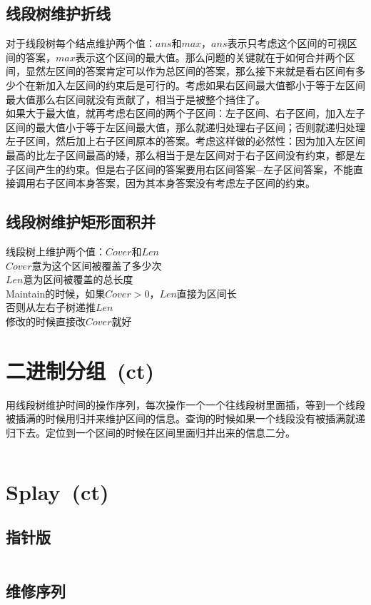	\subsection*{线段树维护折线}
		对于线段树每个结点维护两个值：$ ans $和$ max $，$ ans $表示只考虑这个区间的可视区间的答案，$ max $表示这个区间的最大值。那么问题的关键就在于如何合并两个区间，显然左区间的答案肯定可以作为总区间的答案，那么接下来就是看右区间有多少个在新加入左区间的约束后是可行的。考虑如果右区间最大值都小于等于左区间最大值那么右区间就没有贡献了，相当于是被整个挡住了。
		\\如果大于最大值，就再考虑右区间的两个子区间：左子区间、右子区间，加入左子区间的最大值小于等于左区间最大值，那么就递归处理右子区间；否则就递归处理左子区间，然后加上右子区间原本的答案。考虑这样做的必然性：因为加入左区间最高的比左子区间最高的矮，那么相当于是左区间对于右子区间没有约束，都是左子区间产生的约束。但是右子区间的答案要用右区间答案$ - $左子区间答案，不能直接调用右子区间本身答案，因为其本身答案没有考虑左子区间的约束。
	\subsection*{线段树维护矩形面积并}
		线段树上维护两个值：$ Cover $和$ Len $
		\\$ Cover $意为这个区间被覆盖了多少次
		\\$ Len $意为区间被覆盖的总长度
		\\Maintain的时候，如果$ Cover > 0 $，$ Len $直接为区间长
		\\否则从左右子树递推$ Len $
		\\修改的时候直接改$ Cover $就好
\section{二进制分组\ \small(ct)}
	用线段树维护时间的操作序列，每次操作一个一个往线段树里面插，等到一个线段被插满的时候用归并来维护区间的信息。查询的时候如果一个线段没有被插满就递归下去。定位到一个区间的时候在区间里面归并出来的信息二分。
	\inputminted{cpp}{DataStructure/binary_group.cpp}
\section{Splay\ \small(ct)}
	\subsection*{指针版}
		\inputminted{cpp}{DataStructure/splay.cpp}
	\subsection*{维修序列}
		\inputminted{cpp}{DataStructure/splay_arr.cpp}
